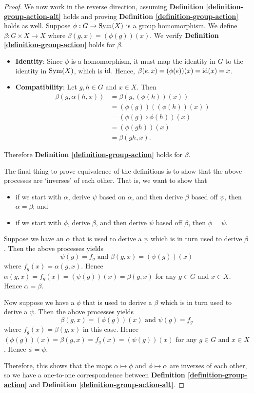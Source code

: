 \begin{proof}
    We now work in the reverse direction, assuming \textbf{Definition \ref{definition-group-action-alt}} holds and proving \textbf{Definition \ref{definition-group-action}} holds as well. Suppose $\phi: G \to \mathrm{Sym}(X)$ is a group homomorphism. We define $\beta: G \times X \to X$ where $\beta(g, x) = (\phi(g))(x)$. We verify \textbf{Definition \ref{definition-group-action}} holds for $\beta$.
    \begin{itemize}
        \item \textbf{Identity}: Since $\phi$ is a homomorphism, it must map the identity in $G$ to the identity in $\mathrm{Sym}(X)$, which is $\mathrm{id}$. Hence, $\beta(e, x) = (\phi(e))(x) = \mathrm{id}(x) = x$.
        \item \textbf{Compatibility}: Let $g, h \in G$ and $x \in X$. Then
        \begin{align*}
            \beta(g, \alpha(h, x)) &= \beta(g, (\phi(h))(x))\\
            &= (\phi(g))((\phi(h))(x))\\
            &= (\phi(g) \circ \phi(h))(x)\\
            &= (\phi(gh))(x)\\
            &= \beta(gh, x).
        \end{align*}
    \end{itemize}
    Therefore \textbf{Definition \ref{definition-group-action}} holds for $\beta$.

    The final thing to prove equivalence of the definitions is to show that the above processes are `inverses' of each other. That is, we want to show that
    \begin{itemize}
        \item if we start with $\alpha$, derive $\psi$ based on $\alpha$, and then derive $\beta$ based off $\psi$, then $\alpha = \beta$; and
        \item if we start with $\phi$, derive $\beta$, and then derive $\psi$ based off $\beta$, then $\phi = \psi$.
    \end{itemize}

    Suppose we have an $\alpha$ that is used to derive a $\psi$ which is in turn used to derive $\beta$. Then the above processes yields
    \[
        \psi(g) = f_g \text{ and } \beta(g, x) = (\psi(g))(x)
    \]
    where $f_g(x) = \alpha(g, x)$. Hence $\alpha(g, x) = f_g(x) = (\psi(g))(x) = \beta(g, x)$ for any $g \in G$ and $x \in X$. Hence $\alpha = \beta$.

    Now suppose we have a $\phi$ that is used to derive a $\beta$ which is in turn used to derive a $\psi$. Then the above processes yields
    \[
        \beta(g, x) = (\phi(g))(x) \text{ and } \psi(g) = f_g
    \]
    where $f_g(x) = \beta(g, x)$ in this case. Hence $(\phi(g))(x) = \beta(g, x) = f_g(x) = (\psi(g))(x)$ for any $g \in G$ and $x \in X$. Hence $\phi = \psi$.

    Therefore, this shows that the maps $\alpha \mapsto \phi$ and $\phi \mapsto \alpha$ are inverses of each other, so we have a one-to-one correspondence between \textbf{Definition \ref{definition-group-action}} and \textbf{Definition \ref{definition-group-action-alt}}.
\end{proof}
